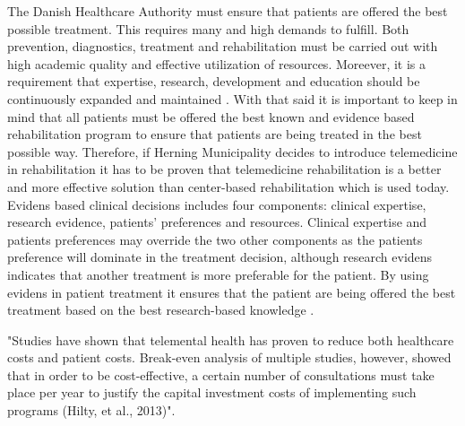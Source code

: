 The Danish Healthcare Authority must ensure that patients are offered the best possible treatment. This requires many and high demands to fulfill. Both prevention, diagnostics, treatment and rehabilitation must be carried out with high academic quality and effective utilization of resources. Moreever, it is a requirement that expertise, research, development and education should be continuously expanded and maintained \cite{plan}. With that said it is important to keep in mind that all patients must be offered the best known and evidence based rehabilitation program to ensure that patients are being treated in the best possible way. Therefore, if Herning Municipality decides to introduce telemedicine in rehabilitation it has to be proven that telemedicine rehabilitation is a better and more effective solution than center-based rehabilitation which is used today. Evidens based clinical decisions includes four components: clinical expertise, research evidence, patients' preferences and resources. Clinical expertise and patients preferences may override the two other components as the patients preference will dominate in the treatment decision, although research evidens indicates that another treatment is more preferable for the patient. By using evidens in patient treatment it ensures that the patient are being offered the best treatment based on the best research-based knowledge \cite{evidence}.            


       











"Studies have shown that telemental health has proven to reduce both
healthcare costs and patient costs. Break-even analysis of multiple studies, however, showed that in order
to be cost-effective, a certain number of consultations must take place per year to justify the capital
investment costs of implementing such programs (Hilty, et al., 2013)". \cite{considerations}

